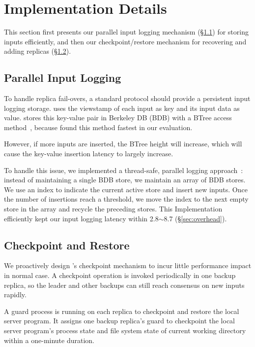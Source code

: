 \section{Implementation Details} \label{sec:impl}

This section first presents our parallel input logging mechanism 
(\S\ref{sec:logging}) for storing inputs efficiently, and then our 
checkpoint/restore mechanism for recovering and adding replicas 
(\S\ref{sec:checkpoint}).

\subsection{Parallel Input Logging} \label{sec:logging}

To handle replica fail-overs, a standard \paxos protocol should provide a 
persistent input logging storage. \xxx uses the \paxos viewstamp of each input 
as key and its input data as value. \xxx stores this key-value pair in 
Berkeley DB (BDB) with a BTree access method~\cite{berkeleydb}, because found 
this method fastest in our evaluation.

However, if more inputs are inserted, the BTree height 
will increase, which will cause the key-value insertion latency to 
largely increase.

To handle this issue, we implemented a thread-safe, 
parallel logging approach~\cite{Bessani:usenix13}: instead of maintaining a 
single BDB store, we maintain an array of BDB stores. We use an index to 
indicate the current active store and insert new inputs. Once the number of 
insertions reach a threshold, we move the index to the next empty store in the 
array and recycle the preceding stores. This Implementation efficiently kept our 
input logging latency within 2.8$\sim$8.7 \us (\S\ref{sec:overhead}).

\subsection{Checkpoint and Restore} \label{sec:checkpoint}

We proactively design \xxx's checkpoint mechanism to incur little performance 
impact in normal case. A checkpoint operation is invoked periodically 
in one backup replica, so the leader and other backups can still reach 
consensus on new inputs rapidly.

A guard process is running on each replica to checkpoint and restore the 
local server program. It assigns one backup 
replica's guard to checkpoint the local server program's process state and file 
system state of current working directory within a one-minute duration.

